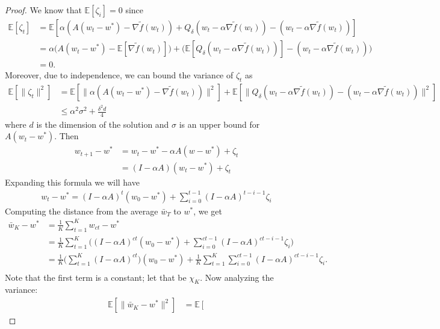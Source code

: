 \begin{proof}
We know that $\mathbb{E}[\zeta_i] = 0$ since
\begin{align*}
    \mathbb{E}[\zeta_t] &= \mathbb{E}[\alpha(A(w_t - w^*) - \nabla\tilde{f}(w_t)) + Q_\delta(w_t - \alpha \nabla \tilde{f}(w_t)) - (w_t - \alpha \nabla \tilde{f}(w_t))] \\
    &=\alpha \big(A(w_t - w^*) - \mathbb{E}[\nabla\tilde{f}(w_t)]\big) + \big(\mathbb{E}[Q_\delta(w_t - \alpha \nabla \tilde{f}(w_t))] - (w_t - \alpha \nabla \tilde{f}(w_t))\big) \\
    &= 0.
\end{align*}
Moreover, due to independence, we can bound the variance of $\zeta_t$ as
\begin{align*}
    \mathbb{E}\left[ \| \zeta_t \|^2 \right] 
    &= 
    \mathbb{E}\left[ \| \alpha(A(w_t - w^*) - \nabla\tilde{f}(w_t)) \|^2 \right] 
    + 
    \mathbb{E}\left[ \| Q_\delta(w_t - \alpha \nabla \tilde{f}(w_t)) - (w_t - \alpha \nabla \tilde{f}(w_t)) \|^2 \right] \\
    &\leq
    \alpha^2\sigma^2 + \frac{\delta^2 d}{4}
\end{align*}
where $d$ is the dimension of the solution and $\sigma$ is an upper bound for $A(w_t - w^*)$.
Then 
\begin{align*}
    w_{t+1} - w^* &= w_t - w^* - \alpha A(w-w^*) + \zeta_t \\
    &= (I-\alpha A)(w_t - w^*) + \zeta_t
\end{align*}
Expanding this formula we will have
\begin{align*}
    w_t - w^* = (I-\alpha A)^t(w_0-w^*) + \displaystyle\sum_{i=0}^{t-1} (I-\alpha A)^{t-i-1}\zeta_i
\end{align*}
Computing the distance from the average $\bar{w}_T$ to $w^*$, we get
\begin{align*}
    \bar{w}_K - w^* &= \frac{1}{K}\displaystyle\sum_{t=1}^K w_{ct} - w^* \\
    &=\frac{1}{K}\displaystyle\sum_{t=1}^K\bigg(
    (I-\alpha A)^{ct}(w_0-w^*) + \displaystyle\sum_{i=0}^{ct-1} (I-\alpha A)^{ct-i-1}\zeta_i
    \bigg) \\
    &=\frac{1}{K}\bigg(\displaystyle\sum_{t=1}^K(I-\alpha A)^{ct}\bigg)(w_0-w^*) 
    + \frac{1}{K}\displaystyle\sum_{t=1}^K\displaystyle\sum_{i=0}^{ct-1} (I-\alpha A)^{ct-i-1}\zeta_i. \\
\end{align*}
Note that the first term is a constant; let that be $\chi_K$. Now analyzing the variance:
\begin{align*}
\mathbb{E}\left[\|\bar{w}_K - w^*\|^2\right] &= \mathbb{E}\left[

\end{align*}
\end{proof}
